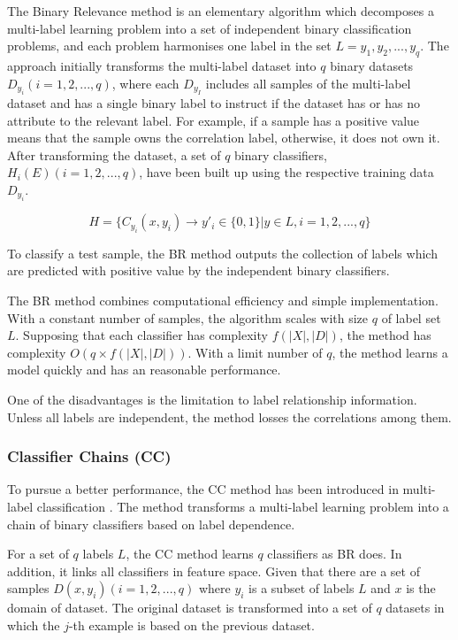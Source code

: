 The Binary Relevance method is an elementary algorithm which decomposes a multi-label learning problem into a set of independent binary classification problems, and each problem harmonises one label in the set $L = {y_{1}, y_{2},...,y_{q}}$. The approach initially transforms the multi-label dataset into $q$ binary datasets $D_{y_{i}} (i = 1,2,...,q)$, where each $D_{y_{I}}$ includes all samples of the multi-label dataset and has a single binary label to instruct if the dataset has or has no attribute to the relevant label. For example, if a sample has a positive value means that the sample owns the correlation label, otherwise, it does not own it. After transforming the dataset, a set of $q$ binary classifiers, $H_{i}(E) (i = 1,2,...,q)$, have been built up using the respective training data $D_{y_{i}}$. 

\begin{equation}\label{eq:BinaryRelevance}
H = \{C_{y_{i}}(x, y_{i}) \to y'_{i} \in \{0,1\}| y \in L, i = 1,2,...,q\}
\end{equation}

To classify a test sample, the BR method outputs the collection of labels which are predicted with positive value by the independent binary classifiers.

The BR method combines computational efficiency and simple implementation. With a constant number of samples, the algorithm scales with size $q$ of label set $L$. Supposing that each classifier has complexity $f(|X|,|D|)$, the method has complexity $O(q \times f(|X|,|D|))$. With a limit number of $q$, the method learns a model quickly and has an reasonable performance.

One of the disadvantages is the limitation to label relationship information. Unless all labels are independent, the method losses the correlations among them.

\subsubsection{Classifier Chains (CC)}

To pursue a better performance, the CC method has been introduced in multi-label classification \citep{read2011classifier}. The method transforms a multi-label learning problem into a chain of binary classifiers based on label dependence.

For a set of $q$ labels $L$, the CC method learns $q$ classifiers as BR does. In addition, it links all classifiers in feature space. Given that there are a set of samples $D(x,y_{i}) (i = 1,2,...,q)$ where $y_{i}$ is a subset of labels $L$ and $x$ is the domain of dataset. The original dataset is transformed into a set of $q$ datasets in which the $j$-th example is based on the previous dataset.

